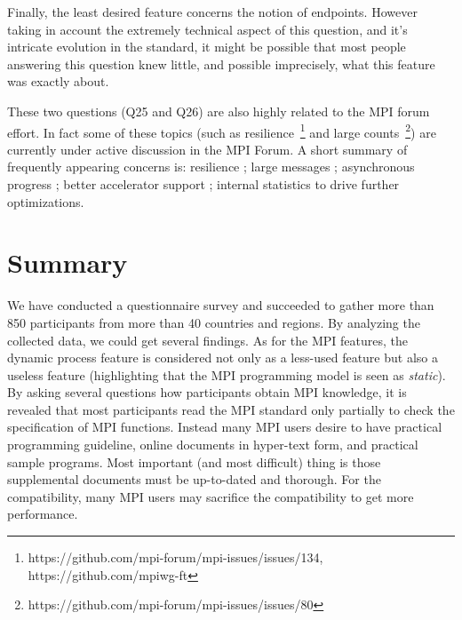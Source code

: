 \documentclass[conference,10pt,letterpaper]{IEEEtran}
\begin{document}
Finally, the least desired feature concerns the notion of endpoints.
However taking in account the extremely technical aspect of this question, and
it's intricate evolution in the standard, it might be possible that most people
answering this question knew little, and possible imprecisely, what this feature
was exactly about.


These two questions (Q25 and Q26) are also highly related to the MPI forum effort. 
In fact some of these topics (such as
resilience~\footnote{https://github.com/mpi-forum/mpi-issues/issues/134,
https://github.com/mpiwg-ft} and large
counts~\footnote{https://github.com/mpi-forum/mpi-issues/issues/80}) are
currently under active discussion in the MPI Forum.
%
A short summary of frequently appearing concerns is: resilience ;
large messages ; asynchronous progress ; better accelerator support ;
internal statistics to drive further optimizations.





\section{Summary}

We have conducted a questionnaire survey and succeeded to gather more
than 850 participants from more than 40 countries and regions. By
analyzing the collected data, we could get several findings. As for
the MPI features, the dynamic process feature is considered not only
as a less-used feature but also a useless feature (highlighting that
the MPI programming model is seen as {\em static}). By asking several
questions how participants obtain MPI knowledge, it is revealed that
most participants read the MPI standard only partially to check the
specification of MPI functions. Instead many MPI users desire to have
practical programming guideline, online documents in
hyper-text form, and practical sample programs. Most important
(and most difficult) thing is those supplemental
documents must be up-to-dated and thorough. For the
compatibility, many MPI users may sacrifice the compatibility to get
more performance. 
\end{document}
